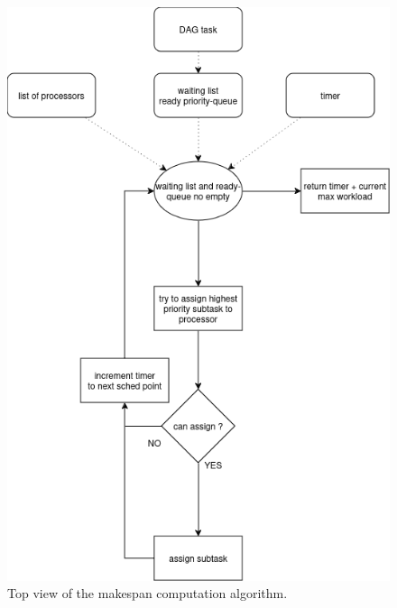 \begin{figure}
    \centering
    \includegraphics[width=\linewidth]{images/makespan_computation_algorithm_global.png}
    \caption{Top view of the makespan computation algorithm.}
    \label{fig:algo_makespan}
\end{figure}

